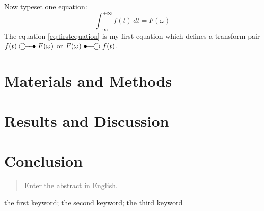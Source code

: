 \documentclass[bachelorthesis]{fer}
\begin{document}
Now typeset one equation:
\begin{equation}
  \label{eq:firstequation}
  \int_{-\infty}^{+\infty}f(t)\,dt=F(\omega)
\end{equation}
The equation \eqref{eq:firstequation} is my first equation which defines a transform pair $f(t)\ufrek F(\omega)$ or $F(\omega)\uvrem f(t)$.


\chapter{Materials and Methods}
\label{sec:materialsandmethods}

\Blindtext


\chapter{Results and Discussion}
\label{sec:results_and_discussion}

\Blindtext


\chapter{Conclusion}
\label{chp:conclusion}

\blindtext








\begin{abstract}
  Enter the abstract in English.
  
  \blindtext
\end{abstract}

\begin{keywords}
  the first keyword; the second keyword; the third keyword
\end{keywords}
\end{document}
